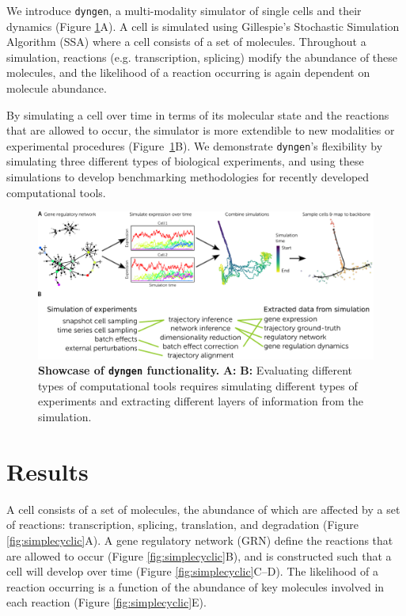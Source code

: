 We introduce \texttt{dyngen}, a multi-modality simulator of single cells and their dynamics (Figure \ref{fig:showcase}A). A cell is simulated using Gillespie's Stochastic Simulation Algorithm (SSA) \cite{gillespie_exactstochasticsimulation_1977} where a cell consists of a set of molecules. Throughout a simulation, reactions (e.g. transcription, splicing) modify the abundance of these molecules, and the likelihood of a reaction occurring is again dependent on molecule abundance.

By simulating a cell over time in terms of its molecular state and the reactions that are allowed to occur, the simulator is more extendible to new modalities or experimental procedures (Figure~\ref{fig:showcase}B). We demonstrate \texttt{dyngen}'s flexibility by simulating three different types of biological experiments, and using these simulations to develop benchmarking methodologies for recently developed computational tools.

\begin{figure}[htb!]
	\centering
	\includegraphics[width=\linewidth]{fig/showcase_4} 
	\caption{
		\textbf{Showcase of \texttt{dyngen} functionality.} 
		\textbf{A:} 
		\textbf{B:} Evaluating different types of computational tools requires simulating different types of experiments and extracting different layers of information from the simulation.
	}
	\label{fig:showcase}
\end{figure}

\section{Results}

A cell consists of a set of molecules, the abundance of which are affected by a set of reactions: transcription, splicing, translation, and degradation (Figure \ref{fig:simplecyclic}A). 
A gene regulatory network (GRN) define the reactions that are allowed to occur (Figure \ref{fig:simplecyclic}B), and is constructed such that a cell will develop over time (Figure \ref{fig:simplecyclic}C--D).
The likelihood of a reaction occurring is a function of the abundance of key molecules involved in each reaction (Figure \ref{fig:simplecyclic}E).

